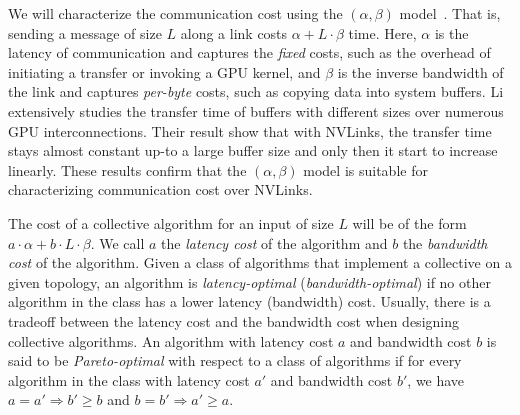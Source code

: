 We will characterize the communication cost using the $(\alpha, \beta)$ model~\cite{hockney1994communication}. That is, sending a message of size $L$ along a link costs $\alpha + L\cdot\beta$ time. 
Here, $\alpha$ is the latency of communication and captures the {\em fixed} costs, such as the overhead of initiating a transfer or invoking a GPU kernel, 
and $\beta$ is the inverse bandwidth of the link and captures {\em per-byte} costs, such as copying data into system buffers. Li \etal{} extensively studies the transfer time of buffers with 
different sizes over numerous GPU interconnections\cite{alphabeta}. Their result show that with NVLinks, the transfer time stays almost constant up-to a large buffer size and only then it start to increase linearly. 
These results confirm that the $(\alpha,\beta)$ model is suitable for characterizing communication cost over NVLinks.

The cost of a collective algorithm for an input of size $L$ will be of the form $a\cdot\alpha + b \cdot L \cdot \beta$. We call $a$ the {\em latency cost} of the algorithm and $b$ the {\em bandwidth cost} of the algorithm. Given a class of algorithms that implement a collective on a given topology, an algorithm is {\em latency-optimal} ({\em bandwidth-optimal}) if no other algorithm in the class has a lower latency (bandwidth) cost. Usually, there is a tradeoff between the latency cost and the bandwidth cost when designing collective algorithms.  An algorithm with latency cost $a$ and bandwidth cost $b$ is said to be {\em Pareto-optimal} with respect to a class of algorithms if for every algorithm in the class with latency cost $a'$ and bandwidth cost $b'$, we have $a = a' \Rightarrow b' \geq b$ and $b = b' \Rightarrow  a' \geq a$.


